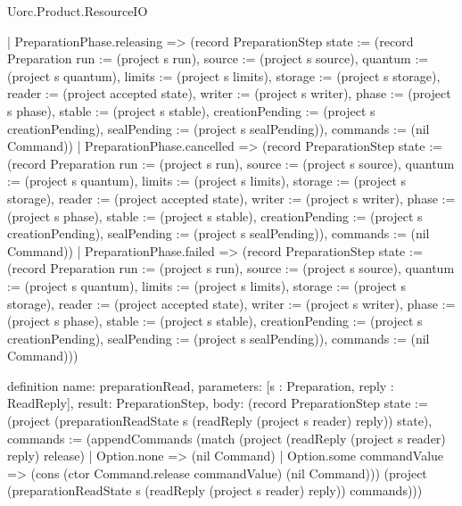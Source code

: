 \begin{lexlean}{Uorc.Product.ResourceIO}
\begin{semanticmodule}
{    | PreparationPhase.releasing => (record PreparationStep {state := (record Preparation {run := (project s run), source := (project s source), quantum := (project s quantum), limits := (project s limits), storage := (project s storage), reader := (project accepted state), writer := (project s writer), phase := (project s phase), stable := (project s stable), creationPending := (project s creationPending), sealPending := (project s sealPending)}), commands := (nil Command)})
    | PreparationPhase.cancelled => (record PreparationStep {state := (record Preparation {run := (project s run), source := (project s source), quantum := (project s quantum), limits := (project s limits), storage := (project s storage), reader := (project accepted state), writer := (project s writer), phase := (project s phase), stable := (project s stable), creationPending := (project s creationPending), sealPending := (project s sealPending)}), commands := (nil Command)})
    | PreparationPhase.failed => (record PreparationStep {state := (record Preparation {run := (project s run), source := (project s source), quantum := (project s quantum), limits := (project s limits), storage := (project s storage), reader := (project accepted state), writer := (project s writer), phase := (project s phase), stable := (project s stable), creationPending := (project s creationPending), sealPending := (project s sealPending)}), commands := (nil Command)}))
}

definition{
  name: preparationRead,
  parameters: [s : Preparation, reply : ReadReply],
  result: PreparationStep,
  body: (record PreparationStep {state := (project (preparationReadState s (readReply (project s reader) reply)) state), commands := (appendCommands (match (project (readReply (project s reader) reply) release)
    | Option.none => (nil Command)
    | Option.some commandValue => (cons (ctor Command.release commandValue) (nil Command))) (project (preparationReadState s (readReply (project s reader) reply)) commands))})
}


\end{semanticmodule}
\end{lexlean}
